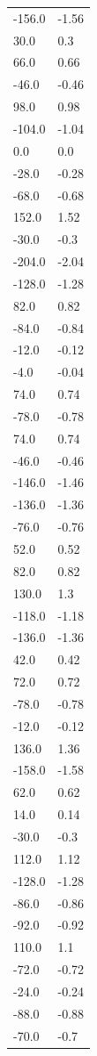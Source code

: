 \begin{longtable}{ll}
-156.0 & -1.56 \\
30.0 & 0.3 \\
66.0 & 0.66 \\
-46.0 & -0.46 \\
98.0 & 0.98 \\
-104.0 & -1.04 \\
0.0 & 0.0 \\
-28.0 & -0.28 \\
-68.0 & -0.68 \\
152.0 & 1.52 \\
-30.0 & -0.3 \\
-204.0 & -2.04 \\
-128.0 & -1.28 \\
82.0 & 0.82 \\
-84.0 & -0.84 \\
-12.0 & -0.12 \\
-4.0 & -0.04 \\
74.0 & 0.74 \\
-78.0 & -0.78 \\
74.0 & 0.74 \\
-46.0 & -0.46 \\
-146.0 & -1.46 \\
-136.0 & -1.36 \\
-76.0 & -0.76 \\
52.0 & 0.52 \\
82.0 & 0.82 \\
130.0 & 1.3 \\
-118.0 & -1.18 \\
-136.0 & -1.36 \\
42.0 & 0.42 \\
72.0 & 0.72 \\
-78.0 & -0.78 \\
-12.0 & -0.12 \\
136.0 & 1.36 \\
-158.0 & -1.58 \\
62.0 & 0.62 \\
14.0 & 0.14 \\
-30.0 & -0.3 \\
112.0 & 1.12 \\
-128.0 & -1.28 \\
-86.0 & -0.86 \\
-92.0 & -0.92 \\
110.0 & 1.1 \\
-72.0 & -0.72 \\
-24.0 & -0.24 \\
-88.0 & -0.88 \\
-70.0 & -0.7 \\

\end{longtable}
